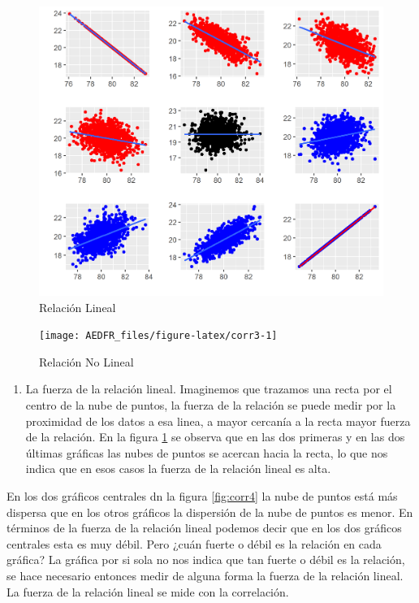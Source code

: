 \documentclass[letterpaper,]{book}
\providecommand{\tightlist}{%
  \setlength{\itemsep}{0pt}\setlength{\parskip}{0pt}}
\begin{document}
\begin{figure}[h]

{\centering \includegraphics[width=0.5\linewidth]{corr2} 

}

\caption{Relación Lineal}\label{fig:corr2}
\end{figure}

\begin{figure}[h]

{\centering \texttt{[image: AEDFR\_files/figure-latex/corr3-1]} 

}

\caption{Relación No Lineal}\label{fig:corr3}
\end{figure}

\begin{enumerate}
\def\labelenumi{\arabic{enumi}.}
\setcounter{enumi}{2}
\tightlist
\item
  La fuerza de la relación lineal. Imaginemos que trazamos una recta por el centro de la nube de puntos, la fuerza de la relación se puede medir por la proximidad de los datos a esa linea, a mayor cercanía a la recta mayor fuerza de la relación. En la figura \ref{fig:corr2} se observa que en las dos primeras y en las dos últimas gráficas las nubes de puntos se acercan hacia la recta, lo que nos indica que en esos casos la fuerza de la relación lineal es alta.
\end{enumerate}

En los dos gráficos centrales dn la figura \ref{fig:corr4} la nube de puntos está más dispersa que en los otros gráficos la dispersión de la nube de puntos es menor. En términos de la fuerza de la relación lineal podemos decir que en los dos gráficos centrales esta es muy débil. Pero ¿cuán fuerte o débil es la relación en cada gráfica? La gráfica por si sola no nos indica que tan fuerte o débil es la relación, se hace necesario entonces medir de alguna forma la fuerza de la relación lineal. La fuerza de la relación lineal se mide con la correlación.
\end{document}
